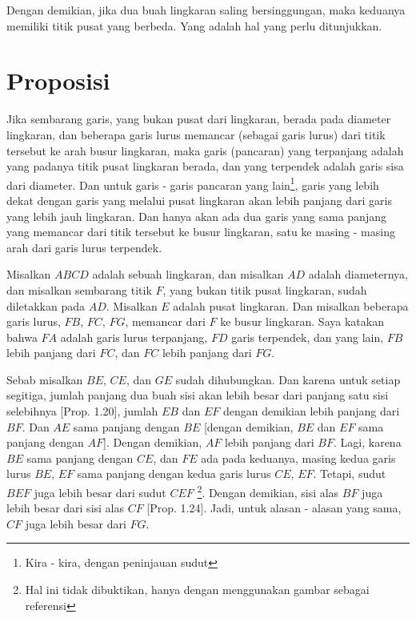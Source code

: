 \documentclass[a4paper]{book}
\begin{document}
Dengan demikian, jika dua buah lingkaran saling bersinggungan, maka keduanya
memiliki titik pusat yang berbeda. Yang adalah hal yang perlu ditunjukkan.

\section*{\centering Proposisi \thesection}
Jika sembarang garis, yang bukan pusat dari lingkaran, berada pada diameter
lingkaran, dan beberapa garis lurus memancar (sebagai garis lurus) dari titik 
tersebut ke arah busur lingkaran, maka garis (pancaran) yang terpanjang adalah 
yang padanya titik pusat lingkaran berada, dan yang terpendek adalah garis 
sisa dari diameter. Dan untuk garis - garis pancaran yang
lain\footnote{Kira - kira, dengan peninjauan sudut}, garis yang lebih dekat 
dengan garis yang melalui pusat lingkaran akan 
lebih panjang dari garis yang lebih jauh lingkaran. Dan hanya akan ada dua 
garis yang sama panjang yang memancar dari titik tersebut ke busur lingkaran, 
satu ke masing - masing arah dari garis lurus terpendek.  
\begin{center}
\end{center}

Misalkan $ABCD$ adalah sebuah lingkaran, dan misalkan $AD$ adalah diameternya, 
dan misalkan sembarang titik $F$, yang bukan titik pusat lingkaran, sudah 
diletakkan pada $AD$. Misalkan $E$ adalah pusat lingkaran. Dan misalkan 
beberapa garis lurus, $FB$, $FC$, $FG$, memancar dari $F$ ke busur lingkaran.
Saya katakan bahwa $FA$ adalah garis lurus terpanjang, $FD$ garis terpendek,
dan yang lain,  $FB$ lebih panjang dari $FC$, dan $FC$ lebih panjang dari 
$FG$.

Sebab misalkan $BE$, $CE$, dan $GE$ sudah dihubungkan. Dan karena untuk setiap
segitiga, jumlah panjang dua buah sisi akan lebih besar dari panjang satu sisi 
selebihnya [Prop. 1.20], jumlah $EB$ dan $EF$ dengan demikian lebih panjang 
dari
$BF$. Dan $AE$ sama panjang dengan $BE$ [dengan demikian, $BE$ dan $EF$ sama
panjang dengan $AF$]. Dengan demikian, $AF$ lebih panjang dari $BF$. Lagi,
karena $BE$ sama panjang dengan $CE$, dan $FE$ ada pada keduanya, masing
kedua garis lurus $BE$, $EF$ sama panjang dengan kedua garis lurus $CE$, $EF$.
Tetapi, sudut $BEF$ juga lebih besar dari sudut $CEF$ \footnote{Hal ini tidak
dibuktikan, hanya dengan menggunakan gambar sebagai referensi}. Dengan 
demikian, sisi alas $BF$ juga lebih besar dari sisi alas $CF$ [Prop. 1.24]. 
Jadi, untuk alasan - alasan yang sama, $CF$ juga  lebih besar dari $FG$.
\end{document}
